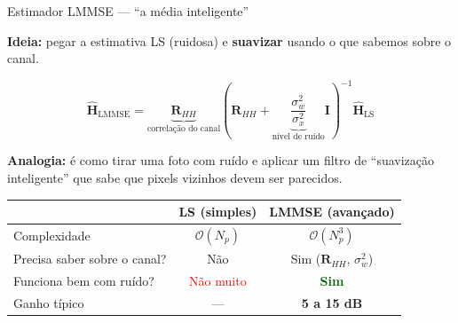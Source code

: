 \documentclass[aspectratio=169, 11pt]{beamer}
\begin{document}

\begin{frame}{Estimador LMMSE --- ``a média inteligente''}

    \textbf{Ideia:} pegar a estimativa LS (ruidosa) e \textbf{suavizar} usando o que sabemos sobre o canal.

    \pause
    \begin{equation*}
        \boxed{\hat{\mathbf{H}}_{\text{LMMSE}} = \underbrace{\mathbf{R}_{HH}}_{\text{correlação do canal}} \left(\mathbf{R}_{HH} + \underbrace{\frac{\sigma_w^2}{\sigma_x^2}}_{\text{nível de ruído}} \mathbf{I}\right)^{-1} \hat{\mathbf{H}}_{\text{LS}}}
    \end{equation*}

    \pause
    \vspace{0.2cm}
    \textbf{Analogia:} é como tirar uma foto com ruído e aplicar um filtro de ``suavização inteligente'' que sabe que pixels vizinhos devem ser parecidos.

    \pause
    \vspace{0.3cm}
    \centering
    \begin{tabular}{lcc}
        \toprule
        & \textbf{LS (simples)} & \textbf{LMMSE (avançado)} \\
        \midrule
        Complexidade & $\mathcal{O}(N_p)$ & $\mathcal{O}(N_p^3)$ \\
        Precisa saber sobre o canal? & Não & Sim ($\mathbf{R}_{HH}$, $\sigma_w^2$) \\
        Funciona bem com ruído? & \textcolor{red}{Não muito} & \textcolor{darkgreen}{\textbf{Sim}} \\
        Ganho típico & --- & \textbf{5 a 15 dB} \\
        \bottomrule
    \end{tabular}
\end{frame}
\end{document}
